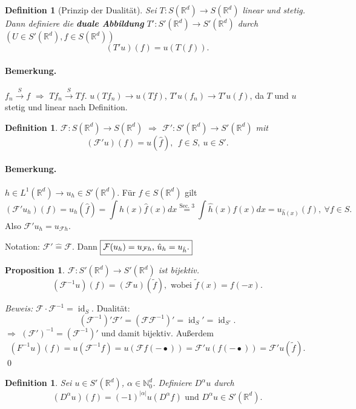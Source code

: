 \documentclass[12pt]{extreport} %
\newtheorem{Definition}[Satz]{Definition}
\newtheorem{Prop}[Satz]{Proposition}
\DeclareMathOperator{\id}{id}
\numberwithin{equation}{section}
\newcommand{\R}{\mathbb{R}} %
\newcommand{\N}{\mathbb{N}} %
\newcommand{\f}{\hat{f}}
\newcommand{\F}{\mathcal{F}}
\newcommand{\m}{\cdot}
\newcommand{\Bew}{\emph{Beweis: }}
\begin{document}
	\begin{Definition}[Prinzip der Dualität]
		Sei $T:S(\R^d)\rightarrow S(\R^d)$ linear und stetig. Dann definiere die \textbf{duale Abbildung} $T':S'(\R^d)\rightarrow S'(\R^d)$ durch $(U\in S'(\R^d), f\in S(\R^d))$
		$$(T'u)(f) = u(T(f)).$$
	\end{Definition}
	
	
	\paragraph{Bemerkung.} $f_n\overset{S}{\rightarrow} f$ $\Rightarrow$ $Tf_n\overset{S}{\rightarrow} Tf$. $u(Tf_n) \rightarrow u(Tf)$, $T'u(f_n)\rightarrow T'u(f)$, da $T$ und $u$ stetig und linear nach Definition.
	
	\begin{Definition}
		$\F:S(\R^d)\rightarrow S(\R^d)$ $\Rightarrow$ $\F':S'(\R^d)\rightarrow S'(\R^d)$ mit 
		$$(\F'u)(f) = u(\f),~~ f\in S,~ u\in S'.$$
	\end{Definition}
	
	\paragraph{Bemerkung.} $h\in L^1(\R^d)\rightarrow u_h\in S'(\R^d)$. Für $f\in S(\R^d)$ gilt 
	$$(\F'u_h)(f) = u_h(\f) = \int h(x) \f(x) dx \overset{\text{Sec. 3}}{=}\int \hat{h}(x)f(x) dx = u_{\hat h (x)}(f),~\forall f\in S.$$
	Also $\F'u_h = u_{\F h}$.
	
	Notation: $\F'\hat{=}\F$. Dann $\boxed{\F(u_h)=u_{\F h}$, $\hat{u}_h = u_{\hat h}.}$
	
	\begin{Prop}
		$\F: S'(\R^d)\rightarrow S'(\R^d)$ ist bijektiv.
		$$(\F^{-1}u)(f) = (\F u)(\tilde{f}), \text{ wobei } \tilde{f}(x) = f(-x).$$
	\end{Prop}
	
	\Bew $\F\m\F^{-1} = \id_S$. Dualität: 
	$$(\F^{-1})'\F' = (\F\F^{-1})' = \id_S'= \id_{S'}.$$
	$\Rightarrow$ $(\F')^{-1} = (\F^{-1})'$ und damit bijektiv. Außerdem 
	$$(F^{-1}u)(f) = u(\F^{-1}f) = u(\F f(-\bullet)) =  \F'u(f(-\bullet)) = \F'u(\tilde{f}).$$
	\qed
	
	
	\begin{Definition}
		Sei $u\in S'(\R^d)$, $\alpha\in \N_0^d$. Definiere $D^\alpha u$ durch
		$$(D^\alpha u)(f) = (-1)^{|\alpha|}u(D^\alpha f)\text{ und } D^\alpha u\in S'(\R^d).$$
	\end{Definition}
	
\end{document}
